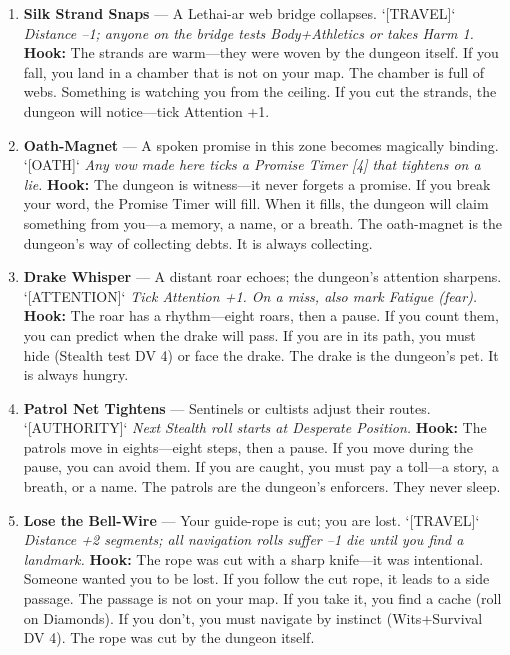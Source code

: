 \begin{enumerate}
\item \textbf{Silk Strand Snaps} --- A Lethai-ar web bridge collapses. `[TRAVEL]`
  \hfill \textit{Distance --1; anyone on the bridge tests Body+Athletics or takes Harm 1.}
  \textbf{Hook:} The strands are warm---they were woven by the dungeon itself. If you fall, you land in a chamber that is not on your map. The chamber is full of webs. Something is watching you from the ceiling. If you cut the strands, the dungeon will notice---tick Attention +1.

\item \textbf{Oath-Magnet} --- A spoken promise in this zone becomes magically binding. `[OATH]`
  \hfill \textit{Any vow made here ticks a Promise Timer [4] that tightens on a lie.}
  \textbf{Hook:} The dungeon is witness---it never forgets a promise. If you break your word, the Promise Timer will fill. When it fills, the dungeon will claim something from you---a memory, a name, or a breath. The oath-magnet is the dungeon's way of collecting debts. It is always collecting.

\item \textbf{Drake Whisper} --- A distant roar echoes; the dungeon's attention sharpens. `[ATTENTION]`
  \hfill \textit{Tick Attention +1. On a miss, also mark Fatigue (fear).}
  \textbf{Hook:} The roar has a rhythm---eight roars, then a pause. If you count them, you can predict when the drake will pass. If you are in its path, you must hide (Stealth test DV 4) or face the drake. The drake is the dungeon's pet. It is always hungry.

\item \textbf{Patrol Net Tightens} --- Sentinels or cultists adjust their routes. `[AUTHORITY]`
  \hfill \textit{Next Stealth roll starts at Desperate Position.}
  \textbf{Hook:} The patrols move in eights---eight steps, then a pause. If you move during the pause, you can avoid them. If you are caught, you must pay a toll---a story, a breath, or a name. The patrols are the dungeon's enforcers. They never sleep.

\item[J] \textbf{Lose the Bell-Wire} --- Your guide-rope is cut; you are lost. `[TRAVEL]`
  \hfill \textit{Distance +2 segments; all navigation rolls suffer --1 die until you find a landmark.}
  \textbf{Hook:} The rope was cut with a sharp knife---it was intentional. Someone wanted you to be lost. If you follow the cut rope, it leads to a side passage. The passage is not on your map. If you take it, you find a cache (roll on Diamonds). If you don't, you must navigate by instinct (Wits+Survival DV 4). The rope was cut by the dungeon itself.


\end{enumerate}
